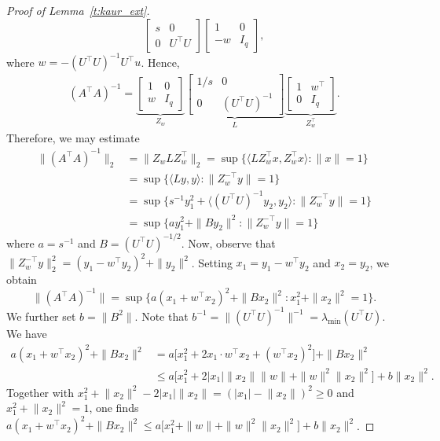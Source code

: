 \documentclass[a4paper, reqno]{amsart}
\begin{document}
\begin{proof}[Proof of Lemma~\ref{t:kaur_ext}]
\[\begin{bmatrix}
    s & 0\\
    0 & U^\top U
\end{bmatrix}
\begin{bmatrix}
    1 & 0\\
    -w & I_q
\end{bmatrix},
\]
where $w = -(U^\top U)^{-1}U^\top u$. Hence,
\begin{align}\label{e:schur}
(A^\top A)^{-1} = 
\underbrace{\begin{bmatrix}
    1 & 0 \\
    w & I_q
\end{bmatrix}}_{Z_w} \underbrace{\begin{bmatrix}
    1/s & 0\\
    0 & (U^\top U)^{-1}
\end{bmatrix}}_L
\underbrace{\begin{bmatrix}
    1 & w^\top \\
    0 & I_q
\end{bmatrix}}_{Z_w^\top}.
\end{align}
Therefore, we may estimate
\begin{align*}
    \|(A^\top A)^{-1}\|_2
    &= \|Z_w LZ_w^\top\|_2 = \sup\big\{\langle LZ_w^\top x,Z_w^\top x\rangle : \|x\|=1\big\} \\
    &= \sup\big\{\langle Ly,y\rangle : \|Z_w^{-\top}y\|=1\big\} \\
&= \sup\big\{s^{-1}y_1^2 + \langle (U^\top U)^{-1}y_2,y_2\rangle : \|Z_w^{-\top}y\|=1\big\}\\
&= \sup\big\{ay_1^2 + \|By_2\|^2 : \|Z_w^{-\top}y\|=1\big\}
\end{align*}
where $a = s^{-1}$ and $B = (U^\top U)^{-1/2}$. 
Now, observe that $\|Z_w^{-\top}y\|^2_2 = (y_1 - w^\top y_2)^2 + \|y_2\|^2$. Setting $x_1 = y_1 - w^\top y_2$ and $x_2 = y_2$, we obtain
\[
\|(A^\top A)^{-1}\| = \sup\big\{a(x_1 + w^\top x_2)^2 + \|Bx_2\|^2 : x_1^2 + \|x_2\|^2 = 1\big\}.
\]
We further set $b = \|B^2\|$. Note that $b^{-1} = \|(U^\top U)^{-1}\|^{-1} = \lambda_{\min}(U^\top U)$. We have
\begin{align*}
    a(x_1 + w^\top x_2)^2 + \|Bx_2\|^2
    & = a\big[x_1^2 + 2x_1\cdot w^\top x_2 + (w^\top x_2)^2\big] + \|Bx_2\|^2\\
    &\le a\big[x_1^2 + 2|x_1|\|x_2\|\|w\| + \|w\|^2\|x_2\|^2\big] + b\|x_2\|^2.
\end{align*}
Together with $x_1^2 + \lVert x_2\rVert^2 -2|x_1|\|x_2\| = (\lvert x_1\rvert - \lVert x_2\rVert)^2\geq 0$ and $x_1^2 + \lVert x_2\rVert^2 = 1$, one finds $a(x_1 + w^\top x_2)^2 + \|Bx_2\|^2 \leq a\big[x_1^2 + \|w\| + \|w\|^2\|x_2\|^2\big] + b\|x_2\|^2$.

\end{proof}
\end{document}

